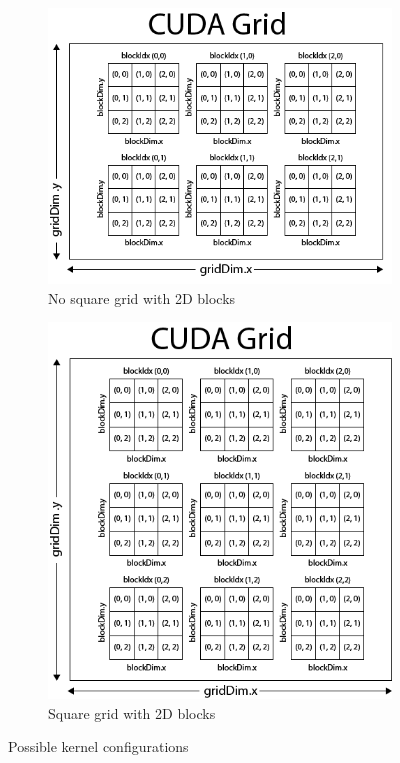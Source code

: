 \documentclass[a4paper]{article}
\begin{document}
\begin{figure}[!ht]
\begin{subfigure}{0.5\textwidth}
\includegraphics[width=\linewidth]{res/2D_no_square}
\caption{No square grid with 2D blocks}
\label{fig:ns2}
\end{subfigure}
\begin{subfigure}{0.5\textwidth}
\centering
\includegraphics[width=\linewidth]{res/2D_square}
\caption{Square grid with 2D blocks}
\label{fig:s2}
\end{subfigure}
\caption{Possible kernel configurations}
 \label{fig:speed}
\end{figure}
\FloatBarrier
\end{document}
